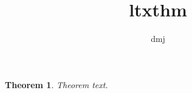 \documentclass{article}
\title{ltxthm}
\author{dmj}
\begin{document}

\newtheorem{theorem}{Theorem}

\begin{theorem}
Theorem text.

\end{theorem}
\end{document}
